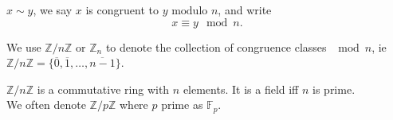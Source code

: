 \documentclass[12pt,oneside]{article}
\begin{document}
\begin{definition}
  $x \sim y$, we say $x$ is congruent to $y \text{ modulo } n$, and write \[x \equiv y \mod n.\]
\end{definition}

\begin{definition}
  We use $\mathbb{Z}/ n \mathbb{Z}$ or $\mathbb{Z}_n$ to denote the collection of congruence classes $\mod n$, ie $\mathbb{Z}/ n \mathbb{Z} = \{\overline{0}, \overline{1}, \dots, \overline{n-1}\}$.
\end{definition}

\begin{theorem}\label{thm:zmodnzringfield}
  $\mathbb{Z}/ n \mathbb{Z}$ is a commutative ring with $n$ elements. It is a field iff $n$ is prime.\\
  We often denote $\mathbb{Z}/p \mathbb{Z}$ where $p$ prime as $\mathbb{F}_p$.
\end{theorem}
\end{document}
